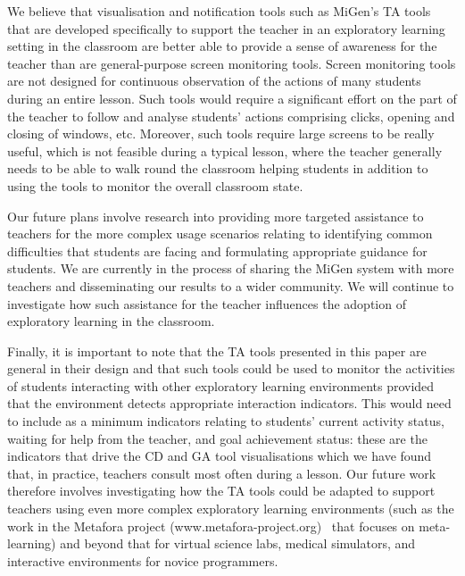 We believe that visualisation and notification tools such as MiGen's TA tools 
that are developed specifically to support the teacher in an exploratory learning setting 
in the classroom are better able to provide a sense of awareness for the teacher 
than are general-purpose screen monitoring tools.
Screen monitoring tools are not designed for continuous observation 
of the actions of many students during an entire lesson. 
Such tools would require a significant effort
on the part of the teacher to follow and analyse students' actions
comprising clicks, opening and closing of windows, etc. Moreover, such
tools require large screens to be really useful, which is not feasible
during a typical lesson, where the teacher generally needs to be able
to walk round the classroom helping students in addition to using the
tools to monitor the overall classroom state. 

Our future plans involve research into providing more targeted 
assistance to teachers for the more complex usage scenarios relating to
identifying common difficulties that students are facing and
formulating appropriate guidance for students. We are currently in the
process of sharing the MiGen system with more teachers and
disseminating our results to a wider community. We will continue 
to investigate how such assistance for the teacher
influences the adoption of exploratory learning in the classroom. 

Finally, it is important to note that the TA tools presented in this
paper are general in their design and that such tools could be used to
monitor the activities of students interacting with other exploratory
learning environments provided that the environment 
detects appropriate interaction indicators.
This would need to include as a minimum indicators relating to 
students' current activity status, 
waiting for help from the teacher, and goal
achievement status: 
these are the indicators that drive the CD and GA tool visualisations 
which we have found that, in practice, teachers consult most often during a lesson. 
Our future work therefore involves investigating how the TA tools
could be adapted to support teachers using even more complex
exploratory learning environments (such as the work in the Metafora
project (www.metafora-project.org)~\cite{Dragon13} that focuses on
meta-learning) and beyond that for virtual science labs, medical simulators, 
and interactive environments for novice programmers.

